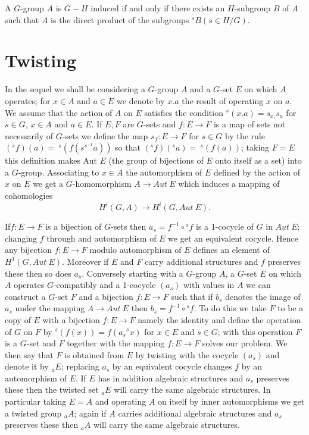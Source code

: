 \begin{lem}%
A  $G$-group $A$ is $G-H$ induced if and only if there exists an
$H$-subgroup $B$ of $A$ such that $A$ is the direct product of the
subgroups $^{s} B(s\in H/G)$. 
\end{lem}


\section{Twisting}\label{chap1:sec1.4}

In the sequel we shall be considering a $G$-group $A$ and a $G$-set $E$
on which $A$ operates; for $x\in A$ and $a\in E$ we denote by $x.a$
the result of operating $x$ on $a$. We assume that the action of $A$
on $E$ satisfies the condition $^{s}(x.a) = s_{x.}s_a$ for $s \in
G$, $x\in A$ and $a \in E$. If $E,F$ are $G$-sets and $f:E\rightarrow F$ is
a map of sets not necessarily of $G$-sets we define the map $s_f : E
\rightarrow F$ for $s \in G$ by the rule $(^{s}f)(a) =
~^{s} (f(s^{s^{-1}} a))$ so that $(^{s}f)(^{s}a) = ~^{s}(f(a))$; taking
$F = E$ this definition makes Aut $E$ (the group of bijections of $E$
onto itself as a set) into a $G$-group. Associating to $x\in A$ the
automorphism of $E$ defined by the action of $x$ on $E$ we get a
$G$-homomorphism $A\rightarrow Aut~ E$ which induces a mapping of
cohomologies 
$$ 
H^i(G,A) \rightarrow H^i(G,Aut~ E). 
$$

If\pageoriginale $f: E \rightarrow F$ is a bijection of $G$-sets then
$a_s = f^{-1} \circ {}^{s}f$ is a 1-cocycle of $G$ in $Aut~E$;
changing $f$ through and 
automorphism of $E$ we get an equivalent cocycle. Hence any bijection
$f:E \rightarrow F$ modulo automorphism of $E$ defines an element of
$H^1(G,Aut~E)$. Moreover if $E$ and $F$ carry additional structures and
$f$ preserves these then so does $a_s$. Conversely starting with a
$G$-group $A$, a $G$-set $E$ on which $A$ operates $G$-compatibly and a
1-cocycle $(a_s)$ with values in $A$ we can construct a $G$-set $F$
and a bijection $f:E \rightarrow F$ such that if $b_s$ denotes the
image of $a_s$ under the mapping $A\rightarrow Aut ~E$ then $b_s =
f^{-1} \circ {}^{s}f$. To do this we take $F$ to be a copy of $E$ with a
bijection $f:E\rightarrow F$ namely the identity and define the
operation of $G$ 
on $F$ by ${}^{s}(f(x)) = f(a_s {}^{s}x)$ for $x\in E$ and $s \in G$;
with this 
operation $F$ is a $G$-set and $F$ together with the mapping
$f:E\rightarrow F$ solves our problem. We then say that $F$ is
obtained from $E$ by twisting with the cocycle $(a_s)$ and denote it
by ${}_{a}E$; replacing $a_s$ by an equivalent cocycle changes $f$ by an
automorphism of $E$. If $E$ has in addition algebraic structures and
$a_s$ preserves these then the twisted set ${}_{a}E$ will carry the same
algebraic structures. In particular taking $E = A$ and operating $A$
on itself by inner automorphisms we get a twisted group $_{a}A$; again
if $A$ carries additional algebraic structures and $a_s$ preserves
these then $_{a}A$ will carry the same algebraic structures. 

